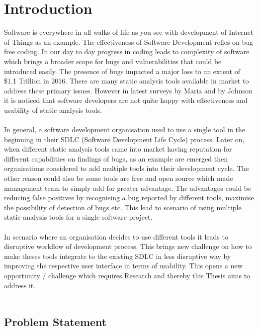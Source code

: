 \chapter{Introduction}
\label{ch:introduction}

Software is everywhere in all walks of life as you see with development of Internet of Things as an example. The effectiveness of Software Development relies on bug free coding. In our day to day progress in coding leads to complexity of software which brings a broader scope for bugs and vulnerabilities that could be introduced easily. The presence of bugs impacted a major loss to an extent of  \$1.1 Trillion in 2016. \cite{report} There are many static analysis tools available in market to address these primary issues. However in latest surveys by Maria \etal{} \cite{CB16} and by Johnson \etal{} \cite{JSMB13} it is noticed that software developers are not quite happy with effectiveness and usability of static analysis tools.
\\ \\

In general, a software development organisation used to use a single tool in the beginning in their SDLC (Software Development Life Cycle) process. Later on, when different static analysis tools came into market having reputation for different capabilities on findings of bugs, as an example are emerged then organisations considered to add multiple tools into their development cycle. The other reason could also be some tools are free and open source which made management team to simply add for greater advantage. The advantages could be reducing false positives by recognising a bug reported by different tools, maximise the possibility of detection of bugs etc. This lead to scenario of using multiple static analysis tools for a single software project.
\\ \\

In scenario where an organisation decides to use different tools it leads to disruptive workflow of development process. This brings new challenge on how to make theses tools integrate to the existing SDLC in less disruptive way by improving the respective user interface in terms of usability. This opens a new opportunity / challenge which requires Research and thereby this Thesis aims to address it.
\\ \\

\section{Problem Statement}

